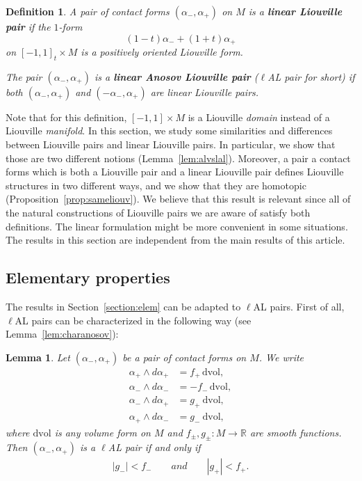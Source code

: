 \documentclass[letterpaper, 11pt]{article}
\numberwithin{equation}{section}
\newtheorem{lem}[thm]{Lemma}
\newtheorem{defn}[thm]{Definition}
\newcommand{\R}{\mathbb{R}}
\begin{document}
\begin{defn} \label{def:linanoliouv}
A pair of contact forms $(\alpha_-, \alpha_+)$ on $M$ is a \textbf{linear Liouville pair} if the $1$-form $$(1-t) \alpha_- + (1+t) \alpha_+$$ on $[-1,1]_t \times M$ is a positively oriented Liouville form. 

The pair $(\alpha_-, \alpha_+)$ is a \textbf{linear Anosov Liouville pair} ($\ell$AL pair for short) if both $(\alpha_-, \alpha_+)$ and $(-\alpha_-, \alpha_+)$ are linear Liouville pairs.
\end{defn}

Note that for this definition, $[-1,1] \times M$ is a Liouville \emph{domain} instead of a Liouville \emph{manifold}. In this section, we study some similarities and differences between Liouville pairs and linear Liouville pairs. In particular, we show that those are two different notions (Lemma~\ref{lem:alvslal}). Moreover, a pair a contact forms which is both a Liouville pair and a linear Liouville pair defines Liouville structures in two different ways, and we show that they are homotopic (Proposition~\ref{prop:sameliouv}). We believe that this result is relevant since all of the natural constructions of Liouville pairs we are aware of satisfy both definitions. The linear formulation might be more convenient in some situations. The results in this section are independent from the main results of this article.

        \subsection{Elementary properties}

The results in Section~\ref{section:elem} can be adapted to $\ell$AL pairs. First of all, $\ell$AL pairs can be characterized in the following way (see Lemma~\ref{lem:charanosov}):

\begin{lem} \label{lem:charanosovlin}
Let $(\alpha_-, \alpha_+)$ be a pair of contact forms on $M$. We write
\begin{align*}
\alpha_+\wedge d \alpha_+ &= f_+ \, \mathrm{dvol}, \\
\alpha_- \wedge d \alpha_- &= - f_- \, \mathrm{dvol}, \\
\alpha_- \wedge d\alpha_+ &= g_+ \ \mathrm{dvol}, \\
\alpha_+\wedge d\alpha_- &= g_- \ \mathrm{dvol}, 
\end{align*}
where $\mathrm{dvol}$ is any volume form on $M$ and $f_\pm, g_\pm : M \rightarrow \R$ are smooth functions.
Then $(\alpha_-, \alpha_+)$ is a $\ell$AL pair if and only if
\begin{align} \label{ineqflin}
|g_-| < f_- \qquad and \qquad |g_+| < f_+.
\end{align}
\end{lem}
\end{document}
